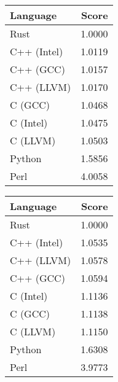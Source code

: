 \begin{subtable}{0.33\textwidth}
    \centering
    \caption{$k=1$}
    \label{table:runtime:regexp(1)}
    \begin{tabular}{|l|r|}
        \hline
        Language & Score \\
        \hline
        Rust & 1.0000 \\
        C++ (Intel) & 1.0119 \\
        C++ (GCC) & 1.0157 \\
        C++ (LLVM) & 1.0170 \\
        C (GCC) & 1.0468 \\
        C (Intel) & 1.0475 \\
        C (LLVM) & 1.0503 \\
        Python & 1.5856 \\
        Perl & 4.0058 \\
        \hline
    \end{tabular}
\end{subtable}%
\begin{subtable}{0.33\textwidth}
    \centering
    \caption{$k=2$}
    \label{table:runtime:regexp(2)}
    \begin{tabular}{|l|r|}
        \hline
        Language & Score \\
        \hline
        Rust & 1.0000 \\
        C++ (Intel) & 1.0535 \\
        C++ (LLVM) & 1.0578 \\
        C++ (GCC) & 1.0594 \\
        C (Intel) & 1.1136 \\
        C (GCC) & 1.1138 \\
        C (LLVM) & 1.1150 \\
        Python & 1.6308 \\
        Perl & 3.9773 \\
        \hline
    \end{tabular}
\end{subtable}%
